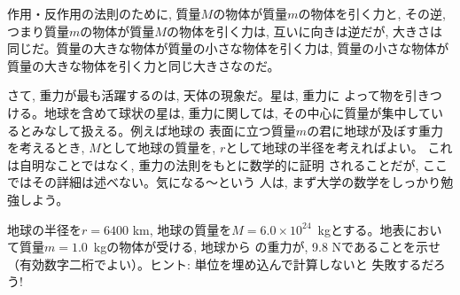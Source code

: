作用・反作用の法則のために, 質量$M$の物体が質量$m$の物体を引く力と, 
その逆, つまり質量$m$の物体が質量$M$の物体を引く力は, 互いに向きは逆だが, 
大きさは同じだ。質量の大きな物体が質量の小さな物体を引く力は, 
質量の小さな物体が質量の大きな物体を引く力と同じ大きさなのだ。

さて, 重力が最も活躍するのは, 天体の現象だ。星は, 重力に
よって物を引きつける。地球を含めて球状の星は, 重力に関しては, 
その中心に質量が集中しているとみなして扱える。例えば地球の
表面に立つ質量$m$の君に地球が及ぼす重力を考えるとき, 
$M$として地球の質量を, $r$として地球の半径を考えればよい。
これは自明なことではなく, 重力の法則をもとに数学的に証明
されることだが, ここではその詳細は述べない。気になる〜という
人は, まず大学の数学をしっかり勉強しよう。\mv

\begin{q}\label{q:grav_accel}
地球の半径を$r=6400$ km, 
地球の質量を$M=6.0×10^{24}$~kgとする。地表において質量$m=1.0$~kgの物体が受ける, 地球から
の重力が, 9.8 Nであることを示せ（有効数字二桁でよい）。ヒント: 単位を埋め込んで計算しないと
失敗するだろう!
\end{q}
\mv

